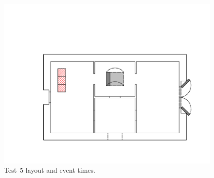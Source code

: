 \documentclass[12pt,oneside]{book}
\begin{document}
\begin{figure}[!ht]
\begin{minipage}[b]{0.9\columnwidth}
	\includegraphics[width=\columnwidth]{../Figures/Floor_Plans/East_Structure_Test_5}
\end{minipage}
\caption{Test~5 layout and event times.}
\label{fig:east_test_5}
\end{figure}
\end{document}
